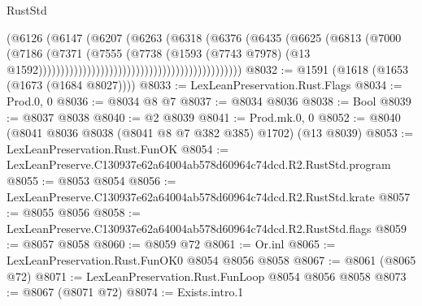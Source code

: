 \begin{lexlean}{RustStd}
\begin{coremodule}
                                                                (@6126
                                                                  (@6147
                                                                    (@6207
                                                                      (@6263
                                                                        (@6318
                                                                          (@6376
                                                                            (@6435
                                                                              (@6625
                                                                                (@6813
                                                                                  (@7000
                                                                                    (@7186
                                                                                      (@7371
                                                                                        (@7555
                                                                                          (@7738
                                                                                            (@1593
                                                                                              (@7743
                                                                                                @7978)
                                                                                              (@13
                                                                                                @1592))))))))))))))))))))))))))))))))))))))))))))))
@8032 := @1591 (@1618 (@1653 (@1673 (@1684 @8027))))
@8033 := LexLeanPreservation.Rust.Flags
@8034 := Prod.{0, 0}
@8036 := @8034 @8 @7
@8037 := @8034 @8036
@8038 := Bool
@8039 := @8037 @8038
@8040 := @2 @8039
@8041 := Prod.mk.{0, 0}
@8052 := @8040 (@8041 @8036 @8038 (@8041 @8 @7 @382 @385) @1702) (@13 @8039)
@8053 := LexLeanPreservation.Rust.FunOK
@8054 := LexLeanPreserve.C130937e62a64004ab578d60964c74dcd.R2.RustStd.program
@8055 := @8053 @8054
@8056 := LexLeanPreserve.C130937e62a64004ab578d60964c74dcd.R2.RustStd.krate
@8057 := @8055 @8056
@8058 := LexLeanPreserve.C130937e62a64004ab578d60964c74dcd.R2.RustStd.flags
@8059 := @8057 @8058
@8060 := @8059 @72
@8061 := Or.inl
@8065 := LexLeanPreservation.Rust.FunOK0 @8054 @8056 @8058
@8067 := @8061 (@8065 @72)
@8071 := LexLeanPreservation.Rust.FunLoop @8054 @8056 @8058
@8073 := @8067 (@8071 @72)
@8074 := Exists.intro.{1}

\end{coremodule}
\end{lexlean}
